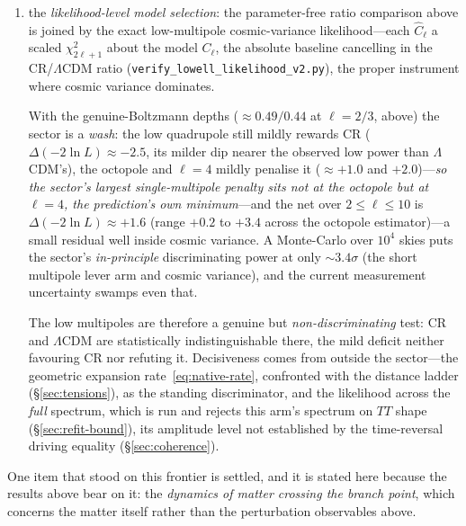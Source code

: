 \documentclass[11pt,a4paper]{article}
\theoremstyle{plain}
\theoremstyle{definition}
\theoremstyle{remark}
\begin{document}
\begin{enumerate}
{target rather than the ambition.} The construction is recursive---each progenitor seeds the next
cosmology---so a \emph{stationary} recursion would make $A_s$ a fixed point and determine it. But entropy per
baryon rises strictly at every branch-point crossing, the crossing being an erasure and the increment bounded
below by Landauer's $k_B\ln2$ independently of the network and of $\eta$~\cite{JanzenCosmogenesis}: \emph{a map
that strictly increases a coordinate has no fixed point}, and independently the chain it generates is finite, so
there is no asymptotic limit for a fixed point to be the limit
of. \emph{So the derivation must reach the head of a
bounded genealogy rather than a stationary state}---the same terminus the inherited composition reaches, and the
two are one question asked of two quantities;
\item the \emph{likelihood-level model selection}: the parameter-free ratio comparison above is joined by the exact low-multipole cosmic-variance likelihood---each $\hat C_\ell$ a scaled $\chi^2_{2\ell+1}$ about the model $C_\ell$, the absolute baseline cancelling in the CR/$\Lambda$CDM ratio (\texttt{verify\_lowell\_likelihood\_v2.py}), the proper instrument where cosmic variance dominates. 

With the genuine-Boltzmann depths ($\approx0.49/0.44$ at $\ell=2/3$, above) the sector is a \emph{wash}: the low quadrupole still mildly rewards CR ($\Delta(-2\ln L)\approx-2.5$, its milder dip nearer the observed low power than $\Lambda$CDM's), the octopole and $\ell=4$ mildly penalise it ($\approx+1.0$ and $+2.0$)---\emph{so the sector's largest single-multipole penalty sits not at the octopole but at $\ell=4$, the prediction's own minimum}---and the net over $2\le\ell\le10$ is $\Delta(-2\ln L)\approx+1.6$ (range $+0.2$ to $+3.4$ across the octopole estimator)---a small residual well inside cosmic variance. A Monte-Carlo over $10^4$ skies puts the sector's \emph{in-principle} discriminating power at only $\sim3.4\sigma$ (the short multipole lever arm and cosmic variance), and the current measurement uncertainty swamps even that. 

The low multipoles are therefore a genuine but \emph{non-discriminating} test: CR and $\Lambda$CDM are statistically indistinguishable there, the mild deficit neither favouring CR nor refuting it. Decisiveness comes from outside the sector---the geometric expansion rate~\eqref{eq:native-rate}, confronted with the distance ladder (\S\ref{sec:tensions}), as the standing discriminator, and the likelihood across the \emph{full} spectrum, which is run and rejects this arm's spectrum on $TT$ shape (\S\ref{sec:refit-bound}), its amplitude level not established by the time-reversal driving equality (\S\ref{sec:coherence}).
\end{enumerate}
One item that stood on this frontier is settled, and it is stated here because the results above bear on it: the \emph{dynamics of matter crossing the branch point}, which concerns the matter itself rather than the perturbation observables above. 
\end{document}
